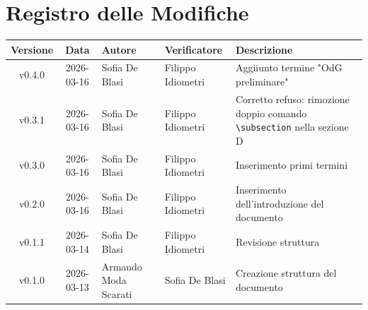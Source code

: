 \section*{Registro delle Modifiche}
\begin{table}[ht]
    \centering
    \renewcommand{\arraystretch}{1.5}
    \begin{tabularx}{\textwidth}{c c l l X}
        \toprule
        \textbf{Versione} & \textbf{Data} & \textbf{Autore} & \textbf{Verificatore} & \textbf{Descrizione} \\
        \midrule
		v0.4.0 & 2026-03-16 & Sofia De Blasi & Filippo Idiometri & Aggiiunto termine "OdG preliminare" \\
        v0.3.1 & 2026-03-16 & Sofia De Blasi & Filippo Idiometri & Corretto refuso: rimozione doppio comando \texttt{\textbackslash subsection} nella sezione D \\
        v0.3.0 & 2026-03-16 & Sofia De Blasi & Filippo Idiometri & Inserimento primi termini \\
        v0.2.0 & 2026-03-16 & Sofia De Blasi & Filippo Idiometri & Inserimento dell'introduzione del documento \\
        v0.1.1 & 2026-03-14 & Sofia De Blasi & Filippo Idiometri & Revisione struttura\\
        v0.1.0 & 2026-03-13 & Armando Moda Scarati & Sofia De Blasi & Creazione struttura del documento \\
        \bottomrule
    \end{tabularx}
\end{table}